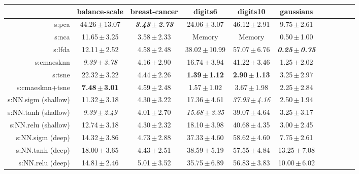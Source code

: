 \begin{table}[ht] \centering
{\small\renewcommand{\arraystretch}{0.7}
\setlength{\tabcolsep}{1pt}
\hspace*{-36pt}
\begin{tabular}{rcccccccccc}
\toprule


& \multicolumn{1}{c}{balance-scale} & \multicolumn{1}{c}{breast-cancer} & \multicolumn{1}{c}{digits6} & \multicolumn{1}{c}{digits10} & \multicolumn{1}{c}{gaussians} \\ 
\midrule
s:\ac{pca} & 44.26\,$\pm$\,13.07 & \emph{\textbf{3.43\,$\pm$\,2.73}} & 24.06\,$\pm$\,3.07 & 46.12\,$\pm$\,2.91 & 9.75\,$\pm$\,2.61 \\
s:\ac{nca} & 11.65\,$\pm$\,3.25 & 3.58\,$\pm$\,2.33 & Memory  & Memory  & 0.50\,$\pm$\,1.00 \\
s:\ac{lfda} & 12.11\,$\pm$\,2.52 & 4.58\,$\pm$\,2.48 & 38.02\,$\pm$\,10.99 & 57.07\,$\pm$\,6.76 & \emph{\textbf{0.25\,$\pm$\,0.75}} \\
s:\ac{cmaesknn} & \emph{9.39\,$\pm$\,3.78} & 4.16\,$\pm$\,2.90 & 16.74\,$\pm$\,3.94 & 41.22\,$\pm$\,3.46 & 1.25\,$\pm$\,2.02 \\
s:\ac{tsne} & 22.32\,$\pm$\,3.22 & 4.44\,$\pm$\,2.26 & \textbf{1.39\,$\pm$\,1.12} & \textbf{2.90\,$\pm$\,1.13} & 3.25\,$\pm$\,2.97 \\
s:\ac{cmaesknn}+\ac{tsne} & \textbf{7.48\,$\pm$\,3.01} & 4.59\,$\pm$\,2.48 & 1.57\,$\pm$\,1.02 & 3.67\,$\pm$\,1.98 & 2.25\,$\pm$\,2.84 \\
s:NN.\ac{sigm} (shallow) & 11.32\,$\pm$\,3.18 & 4.30\,$\pm$\,3.22 & 17.36\,$\pm$\,4.61 & \emph{37.93\,$\pm$\,4.16} & 2.50\,$\pm$\,1.94 \\
s:NN.\ac{tanh} (shallow) & \emph{9.39\,$\pm$\,2.49} & 4.01\,$\pm$\,2.70 & \emph{15.68\,$\pm$\,3.35} & 39.07\,$\pm$\,4.64 & 3.25\,$\pm$\,3.17 \\
s:NN.\ac{relu} (shallow) & 12.74\,$\pm$\,3.18 & 4.30\,$\pm$\,2.32 & 18.10\,$\pm$\,3.98 & 40.68\,$\pm$\,4.35 & 3.00\,$\pm$\,2.45 \\
s:NN.\ac{sigm} (deep) & 14.32\,$\pm$\,3.86 & 4.73\,$\pm$\,2.88 & 37.33\,$\pm$\,4.60 & 58.62\,$\pm$\,4.60 & 7.75\,$\pm$\,2.61 \\
s:NN.\ac{tanh} (deep) & 18.00\,$\pm$\,3.65 & 4.43\,$\pm$\,2.51 & 38.59\,$\pm$\,5.19 & 57.55\,$\pm$\,4.84 & 13.25\,$\pm$\,7.08 \\
s:NN.\ac{relu} (deep) & 14.81\,$\pm$\,2.46 & 5.01\,$\pm$\,3.52 & 35.75\,$\pm$\,6.89 & 56.83\,$\pm$\,3.83 & 10.00\,$\pm$\,6.02 \\

\end{tabular}}
\end{table}

